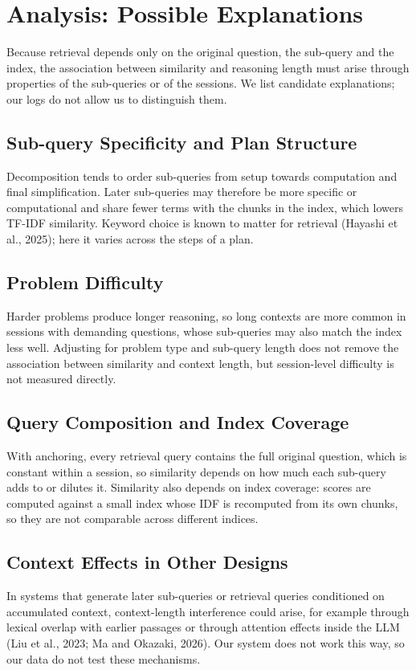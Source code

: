 \documentclass[11pt,a4paper]{article}
\begin{document}
\section{Analysis: Possible Explanations}

Because retrieval depends only on the original question, the sub-query and the index, the association between
similarity and reasoning length must arise through properties of the sub-queries or of the sessions. We list
candidate explanations; our logs do not allow us to distinguish them.

\subsection{Sub-query Specificity and Plan Structure}
Decomposition tends to order sub-queries from setup towards computation and final simplification. Later
sub-queries may therefore be more specific or computational and share fewer terms with the chunks in the
index, which lowers TF-IDF similarity. Keyword choice is known to matter for retrieval (Hayashi et al., 2025);
here it varies across the steps of a plan.

\subsection{Problem Difficulty}
Harder problems produce longer reasoning, so long contexts are more common in sessions with demanding
questions, whose sub-queries may also match the index less well. Adjusting for problem type and sub-query
length does not remove the association between similarity and context length, but session-level difficulty is
not measured directly.

\subsection{Query Composition and Index Coverage}
With anchoring, every retrieval query contains the full original question, which is constant within a session,
so similarity depends on how much each sub-query adds to or dilutes it. Similarity also depends on index
coverage: scores are computed against a small index whose IDF is recomputed from its own chunks, so they are
not comparable across different indices.

\subsection{Context Effects in Other Designs}
In systems that generate later sub-queries or retrieval queries conditioned on accumulated context,
context-length interference could arise, for example through lexical overlap with earlier passages or through
attention effects inside the LLM (Liu et al., 2023; Ma and Okazaki, 2026). Our system does not work this way,
so our data do not test these mechanisms.
\end{document}
